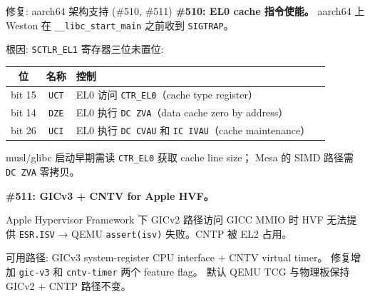 \documentclass[aspectratio=169,10pt]{ctexbeamer}
\begin{document}
\begin{frame}[shrink=20]{修复: aarch64 架构支持 (\#510, \#511)}
\textbf{\#510: EL0 cache 指令使能。} aarch64 上 Weston 在 \texttt{\_\_libc\_start\_main}
之前收到 \texttt{SIGTRAP}。

\vspace{1mm}
根因: \texttt{SCTLR\_EL1} 寄存器三位未置位:

\begin{tabularx}{\textwidth}{c c l X}
\toprule
\textbf{位} & \textbf{名称} & \textbf{控制} \\
\midrule
bit 15 & \texttt{UCT} & EL0 访问 \texttt{CTR\_EL0}（cache type register） \\
bit 14 & \texttt{DZE} & EL0 执行 \texttt{DC ZVA}（data cache zero by address） \\
bit 26 & \texttt{UCI} & EL0 执行 \texttt{DC CVAU} 和 \texttt{IC IVAU}（cache maintenance） \\
\bottomrule
\end{tabularx}

musl/glibc 启动早期需读 \texttt{CTR\_EL0} 获取 cache line size；
Mesa 的 SIMD 路径需 \texttt{DC ZVA} 零拷贝。

\vspace{1mm}
\textbf{\#511: GICv3 + CNTV for Apple HVF。}

Apple Hypervisor Framework 下 GICv2 路径访问 GICC MMIO 时 HVF 无法提供
\texttt{ESR.ISV} → QEMU \texttt{assert(isv)} 失败。CNTP 被 EL2 占用。

可用路径: GICv3 system-register CPU interface + CNTV virtual timer。
修复增加 \texttt{gic-v3} 和 \texttt{cntv-timer} 两个 feature flag。
默认 QEMU TCG 与物理板保持 GICv2 + CNTP 路径不变。
\end{frame}

\end{document}
